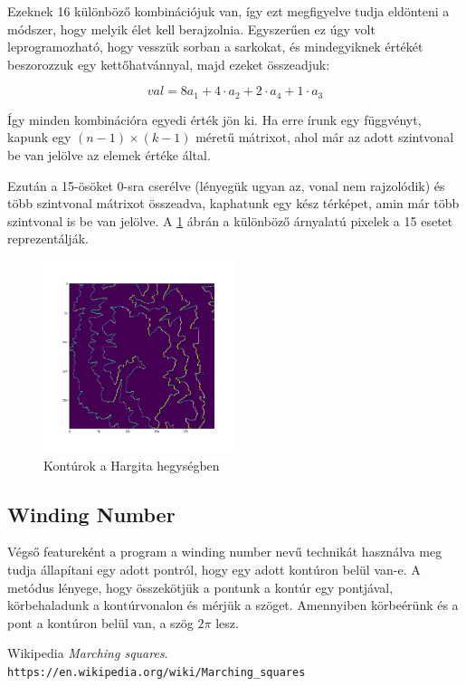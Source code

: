 \documentclass[a4paper, 12pt]{article}
\numberwithin{equation}{section}          %
\numberwithin{figure}{subsection}
\begin{document}
Ezeknek 16 különböző kombinációjuk van, így ezt megfigyelve tudja eldönteni a módszer, hogy melyik élet kell berajzolnia. Egyszerűen ez úgy volt leprogramozható, hogy vesszük sorban a sarkokat, és mindegyiknek értékét beszorozzuk egy kettőhatvánnyal, majd ezeket összeadjuk: 

\begin{equation}
    val=8a_1+4\cdot a_2+2\cdot a_4+1\cdot a_3
\end{equation}

Így minden kombinációra egyedi érték jön ki. Ha erre írunk egy függvényt, kapunk egy $(n-1)\times(k-1)$ méretű mátrixot, ahol már az adott szintvonal be van jelölve az elemek értéke által.

\newpage
Ezután a 15-ösöket 0-sra cserélve (lényegük ugyan az, vonal nem rajzolódik) és több szintvonal mátrixot összeadva, kaphatunk egy kész térképet, amin már több szintvonal is be van jelölve. A \ref{fig:cont} ábrán a különböző árnyalatú pixelek a 15 esetet reprezentálják. 

\begin{figure}[h!]
\begin{center}
\includegraphics[width=0.5\textwidth]{img/cont.png}
\caption{Kontúrok a Hargita hegységben}
\label{fig:cont}
\end{center}
\end{figure}



\subsection{Winding Number}

Végső featureként a program a winding number nevű technikát használva meg tudja állapítani egy adott pontról, hogy egy adott kontúron belül van-e. A metódus lényege, hogy összekötjük a pontunk a kontúr egy pontjával, körbehaladunk a kontúrvonalon és mérjük a szöget. Amennyiben körbeérünk és a pont a kontúron belül van, a szög $2\pi$ lesz.



\newpage \vspace*{2cm}

\pagestyle{empty}

\begin{thebibliography}{9}
Wikipedia 
\textit{Marching squares}. 
\\\texttt{https://en.wikipedia.org/wiki/Marching_squares}

\end{thebibliography}
\end{document}
